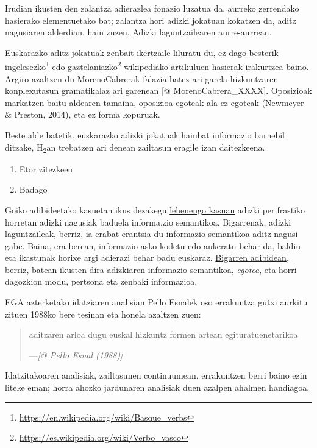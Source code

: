 \documentclass[]{article}
\let\rmarkdownfootnote\footnote%
\def\footnote{\protect\rmarkdownfootnote}
\begin{document}
Irudian ikusten den zalantza adierazlea fonazio luzatua da, aurreko
zerrendako hasierako elementuetako bat; zalantza hori adizki jokatuan
kokatzen da, aditz nagusiaren alderdian, hain zuzen. Adizki
laguntzailearen aurre-aurrean.

Euskarazko aditz jokatuak zenbait ikertzaile liluratu du, ez dago
besterik ingelesezko\footnote{\url{https://en.wikipedia.org/wiki/Basque_verbs}}
edo gaztelaniazko\footnote{\url{https://es.wikipedia.org/wiki/Verbo_vasco}}
wikipediako artikuluen hasierak irakurtzea baino. Argiro azaltzen du
MorenoCabrerak falazia batez ari garela hizkuntzaren konplexutasun
gramatikalaz ari garenean {[}@ MorenoCabrera\_XXXX{]}. Oposizioak
markatzen baitu aldearen tamaina, oposizioa egoteak ala ez egoteak
(Newmeyer \& Preston, 2014), eta ez forma kopuruak.

Beste alde batetik, euskarazko adizki jokatuak hainbat informazio
barnebil ditzake, H\textsubscript{2}an trebatzen ari denean zailtasun
eragile izan daitezkeena.

\begin{enumerate}
\def\labelenumi{(\arabic{enumi})}
\item
  Etor zitezkeen
\item
  Badago
\end{enumerate}

Goiko adibideetako kasuetan ikus dezakegu
\protect\hyperlink{etorzitezkeen}{lehenengo kasuan} adizki perifrastiko
horretan adizki nagusiak baduela informa.zio semantikoa. Bigarrenak,
adizki laguntzaileak, berriz, ia erabat erantsia du informazio
semantikoa aditz nagusi gabe. Baina, era berean, informazio asko kodetu
edo aukeratu behar da, baldin eta ikastunak horixe argi adierazi behar
badu euskaraz. \protect\hyperlink{badago}{Bigarren adibidean}, berriz,
batean ikusten dira adizkiaren informazio semantikoa, \emph{egotea}, eta
horri dagozkion modu, pertsona eta zenbaki informazioa.

EGA azterketako idatziaren analisian Pello Esnalek oso errakuntza gutxi
aurkitu zituen 1988ko bere tesinan eta honela azaltzen zuen:

\begin{quote}
aditzaren arloa dugu euskal hizkuntz formen artean egituratuenetarikoa

---\emph{{[}@ Pello Esnal (1988){]}}
\end{quote}

Idatzitakoaren analisiak, zailtasunen continuumean, errakuntzen berri
baino ezin liteke eman; horra ahozko jardunaren analisiak duen azalpen
ahalmen handiagoa.
\end{document}
